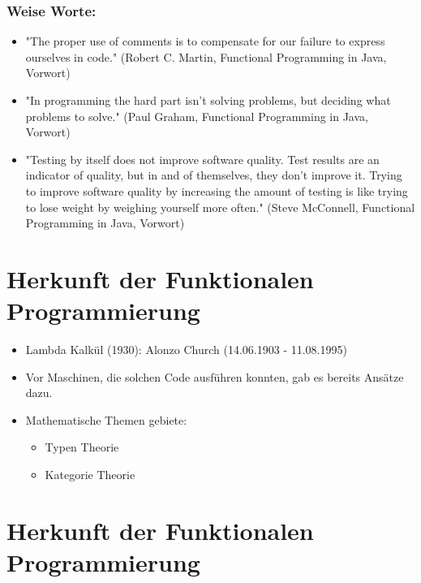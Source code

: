\documentclass{beamer}
\begin{document}
\begin{frame}
\frametitle{Weise Worte:}
\begin{itemize}
\item \textmd{"The proper use of comments is to compensate for our failure to express ourselves in code." (Robert C. Martin, Functional Programming in Java, Vorwort)}
\item \textmd{"In programming the hard part isn’t solving problems, but deciding what problems to solve." (Paul Graham, Functional Programming in Java, Vorwort)}
\item \textmd{"Testing by itself does not improve software quality. Test results are an indicator of quality, but
in and of themselves, they don’t improve it. Trying to improve software quality by increasing
the amount of testing is like trying to lose weight by weighing yourself more often." (Steve McConnell, Functional Programming in Java, Vorwort)}
\end{itemize}
\end{frame}

\section{Herkunft der Funktionalen Programmierung}
\begin{frame}
	\begin{itemize}
		\item Lambda Kalkül (1930): Alonzo Church (14.06.1903 - 11.08.1995)
		\item Vor Maschinen, die solchen Code ausführen konnten, gab es bereits Ansätze dazu.
        \item Mathematische Themen gebiete: 
        \begin{itemize}
        	\item Typen Theorie
        	\item Kategorie Theorie
        \end{itemize} 
	\end{itemize}
\end{frame}


\section{Herkunft der Funktionalen Programmierung}
\begin{frame}
\end{frame}

\begin{frame}
	
	\end{frame}
\end{document}
